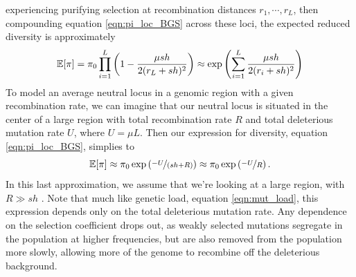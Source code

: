 experiencing purifying selection at recombination distances
$r_1,\cdots,r_L$, then compounding equation \eqref{eqn:pi_loc_BGS}
across these loci, the expected reduced diversity is approximately
\begin{equation}
\mathbb{E}[\pi] = \pi_0  \prod_{i=1}^L \left(1-\frac{\mu sh}{2(r_L+sh)^2}
\right) \approx \exp \left( \sum_{i=1}^L \frac{\mu sh}{2(r_i+sh)^2} \right) \label{eqn:pi_loc_BGS}
\end{equation}
To model an average neutral locus in a genomic region with a given recombination rate, we can imagine that our neutral locus is situated in the center of a large region with
total recombination rate $R$ and total deleterious mutation rate $U$,
where $U = \mu L$. Then our expression for diversity, equation \eqref{eqn:pi_loc_BGS}, simplies to 
\begin{equation}
\mathbb{E}[\pi] \approx \pi_0 \exp \left( \nicefrac{-U}{(sh+R)} \right)
\approx \pi_0 \exp \left( \nicefrac{-U}{R} \right). \label{eqn:GW_BGS_1}
\end{equation}
In this last approximation, we assume that we're looking at a
large region, with $R \gg sh$ . Note that much like genetic load,
equation \eqref{eqn:mut_load}, this expression depends only on the
total deleterious mutation rate. Any dependence on the selection
coefficient drops out, as weakly selected mutations segregate in the population at higher
frequencies, but are also removed from the population more slowly, allowing
more of the genome to recombine off the deleterious background. \\
